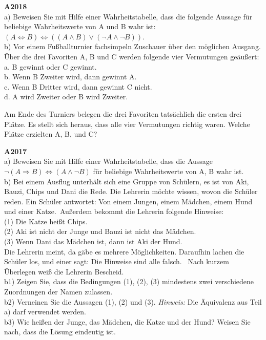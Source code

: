 \documentclass[landscape,twocolumn,a4paper]{article}
\begin{document}
\newpage

\textbf{A2018} \\

a) Beweisen Sie mit Hilfe einer Wahrheitstabelle, dass die folgende Aussage für beliebige Wahrheitswerte
von A und B wahr ist:  $(A \Leftrightarrow B) \Leftrightarrow ((A \land B) \lor (\lnot A \land \lnot B))$. \\

b) Vor einem Fußballturnier fachsimpeln Zuschauer über den möglichen Ausgang. Über die drei Favoriten A, B und C 
werden folgende vier Vermutungen geäußert: \\

a. B gewinnt oder C gewinnt. \\
b. Wenn B Zweiter wird, dann gewinnt A. \\
c. Wenn B Dritter wird, dann gewinnt C  nicht. \\
d. A wird Zweiter oder B wird Zweiter.

Am Ende des Turniers belegen die drei Favoriten tatsächlich die ersten drei Plätze. Es stellt sich heraus, dass 
alle vier Vermutungen richtig waren. Welche Plätze erzielten A, B, und C?
\bigskip 

\textbf{A2017} \\

a) Beweisen Sie mit Hilfe einer Wahrheitstabelle, dass die Aussage
$\lnot (A \Rightarrow B) \Leftrightarrow (A \land \lnot B)$ 
für beliebige Wahrheitswerte von A, B wahr ist. \\

b) Bei einem Ausflug unterhält sich eine Gruppe von Schülern, es ist von Aki, Bauzi, Chips und
Dani die Rede. Die Lehrerin möchte wissen, wovon die Schüler reden. Ein Schüler antwortet:
\glqq Von einem Jungen, einem Mädchen, einem Hund und einer Katze.\grqq\, Außerdem bekommt die
Lehrerin folgende Hinweise: \\
(1) Die Katze heißt Chips. \\
(2) Aki ist nicht der Junge und Bauzi ist nicht das Mädchen. \\
(3) Wenn Dani das Mädchen ist, dann ist Aki der Hund. \\
Die Lehrerin meint, da gäbe es mehrere Möglichkeiten. Daraufhin lachen die Schüler los, und
einer sagt: \glqq Die Hinweise sind alle falsch. \grqq\, Nach kurzem Überlegen weiß die Lehrerin Bescheid. \\

b1) Zeigen Sie, dass die Bedingungen (1), (2), (3) mindestens zwei verschiedene Zuordnungen
der Namen zulassen. \\
b2) Verneinen Sie die Aussagen (1), (2) und (3). 
\textit{Hinweis:} Die Äquivalenz aus Teil a) darf verwendet werden. \\
b3) Wie heißen der Junge, das Mädchen, die Katze und der Hund? Weisen Sie nach, dass
die Lösung eindeutig ist.
\bigskip 
\end{document}
